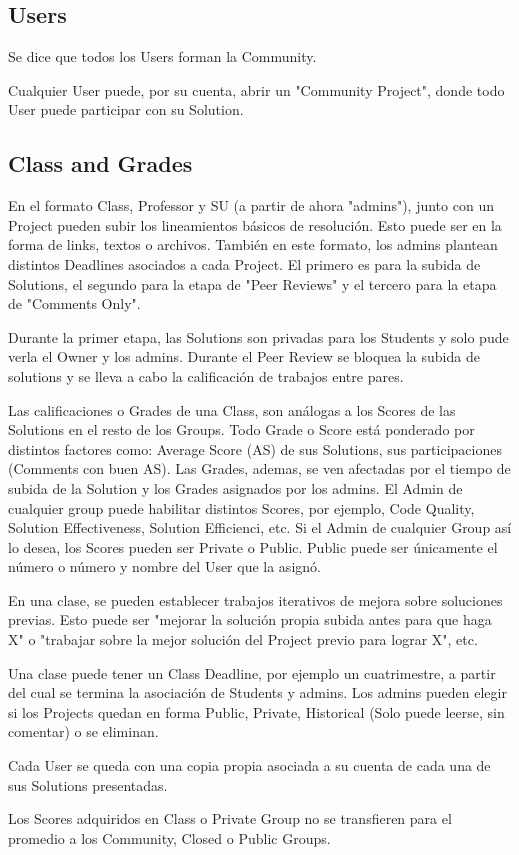 \documentclass[a4paper,10pt]{article}
\begin{document}
\subsection{Users}

Se dice que todos los Users forman la Community.

Cualquier User puede, por su cuenta, abrir un "Community Project", donde todo User puede participar con su Solution.

\subsection{Class and Grades}

En el formato Class, Professor y SU (a partir de ahora "admins"), junto con un Project pueden subir los lineamientos básicos de resolución. Esto puede ser en la forma de links, textos o archivos.
También en este formato, los admins plantean distintos Deadlines asociados a cada Project. El primero es para la subida de Solutions, el segundo para la etapa de "Peer Reviews" y el tercero para la etapa de "Comments Only".

Durante la primer etapa, las Solutions son privadas para los Students y solo pude verla el Owner y los admins. 
Durante el Peer Review se bloquea la subida de solutions y se lleva a cabo la calificación de trabajos entre pares.

Las calificaciones o Grades de una Class, son análogas a los Scores de las Solutions en el resto de los Groups.
Todo Grade o Score está ponderado por distintos factores como: Average Score (AS) de sus Solutions, sus participaciones (Comments con buen AS).
Las Grades, ademas, se ven afectadas por el tiempo de subida de la Solution y los Grades asignados por los admins.
El Admin de cualquier group puede habilitar distintos Scores, por ejemplo, Code Quality, Solution Effectiveness, Solution Efficienci, etc.
Si el Admin de cualquier Group así lo desea, los Scores pueden ser Private o Public. Public puede ser únicamente el número o número y nombre del User que la asignó.

En una clase, se pueden establecer trabajos iterativos de mejora sobre soluciones previas. Esto puede ser "mejorar la solución propia subida antes para que haga X" o "trabajar sobre la mejor solución del Project previo para lograr X", etc.

Una clase puede tener un Class Deadline, por ejemplo un cuatrimestre, a partir del cual se termina la asociación de Students y admins. Los admins pueden elegir si los Projects quedan en forma Public, Private, Historical (Solo puede leerse, sin comentar) o se eliminan.

Cada User se queda con una copia propia asociada a su cuenta de cada una de sus Solutions presentadas. 

Los Scores adquiridos en Class o Private Group no se transfieren para el promedio a los Community, Closed o Public Groups.
\end{document}
